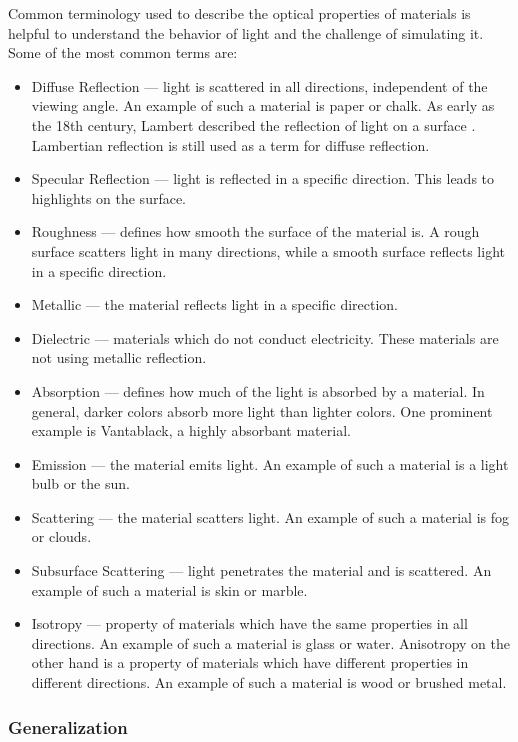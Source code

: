 Common terminology used to describe the optical properties of materials is helpful to understand the behavior of light and the challenge of simulating it. Some of the most common terms are:

\begin{itemize}
  \item{Diffuse Reflection} — light is scattered in all directions, independent of the viewing angle. An example of such a material is paper or chalk. As early as the 18th century, Lambert described the reflection of light on a surface \cite{lambert1760photometria}. Lambertian reflection is still used as a term for diffuse reflection.
  \item{Specular Reflection} — light is reflected in a specific direction. This leads to highlights on the surface.
  \item{Roughness} — defines how smooth the surface of the material is. A rough surface scatters light in many directions, while a smooth surface reflects light in a specific direction.
  \item{Metallic} — the material reflects light in a specific direction.
  \item{Dielectric} — materials which do not conduct electricity. These materials are not using metallic reflection.
  \item{Absorption} — defines how much of the light is absorbed by a material. In general, darker colors absorb more light than lighter colors. One prominent example is Vantablack, a highly absorbant material.
  \item{Emission} — the material emits light. An example of such a material is a light bulb or the sun.
  \item{Scattering} — the material scatters light. An example of such a material is fog or clouds.
  \item{Subsurface Scattering} — light penetrates the material and is scattered. An example of such a material is skin or marble.
  \item{Isotropy} — property of materials which have the same properties in all directions. An example of such a material is glass or water. Anisotropy on the other hand is a property of materials which have different properties in different directions. An example of such a material is wood or brushed metal.
\end{itemize}

\subsubsection{Generalization}
\label{sec:physics-generalization}

